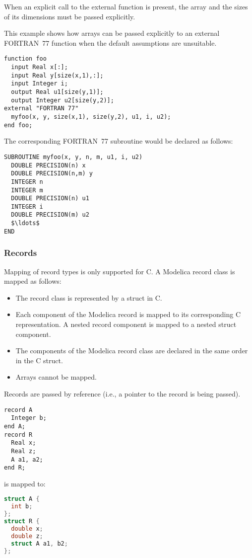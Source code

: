 When an explicit call to the external function is present, the array and
the sizes of its dimensions must be passed explicitly.

\begin{example}
This example shows how arrays can be passed explicitly to an
external FORTRAN~77 function when the default assumptions are
unsuitable.

\begin{lstlisting}[language=modelica]
function foo
  input Real x[:];
  input Real y[size(x,1),:];
  input Integer i;
  output Real u1[size(y,1)];
  output Integer u2[size(y,2)];
external "FORTRAN 77"
  myfoo(x, y, size(x,1), size(y,2), u1, i, u2);
end foo;
\end{lstlisting}
The corresponding FORTRAN~77 subroutine would be declared as follows:
\begin{lstlisting}[language=FORTRAN77]
SUBROUTINE myfoo(x, y, n, m, u1, i, u2)
  DOUBLE PRECISION(n) x
  DOUBLE PRECISION(n,m) y
  INTEGER n
  INTEGER m
  DOUBLE PRECISION(n) u1
  INTEGER i
  DOUBLE PRECISION(m) u2
  $\ldots$
END
\end{lstlisting}
\end{example}

\subsubsection{Records}\label{records}

Mapping of record types is only supported for C.
A Modelica record class is mapped as follows:
\begin{itemize}
\item
  The record class is represented by a struct in C.
\item
  Each component of the Modelica record is mapped to its corresponding C representation.
  A nested record component is mapped to a nested struct component.
\item
  The components of the Modelica record class are declared in the same order in the C struct.
\item
  Arrays cannot be mapped.
\end{itemize}

Records are passed by reference (i.e., a pointer to the record is being
passed).

\begin{example}
\begin{lstlisting}[language=modelica]
record A
  Integer b;
end A;
record R
  Real x;
  Real z;
  A a1, a2;
end R;
\end{lstlisting}
is mapped to:
\begin{lstlisting}[language=C]
struct A {
  int b;
};
struct R {
  double x;
  double z;
  struct A a1, b2;
};
\end{lstlisting}
\end{example}

